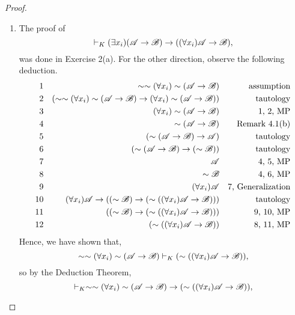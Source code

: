 \begin{proposition}
\begin{proof}
\begin{enumerate}
\begin{enumerate}
          \item 
            The proof of
            \[\vdash_{K} (\exists x_i)(\mathscr{A} \rightarrow \mathscr{B}) \rightarrow ((\forall x_i)\mathscr{A} \rightarrow \mathscr{B}),\]
            was done in Exercise 2(a). For the other direction, observe the following deduction.
            \begin{align*}
              \text{1}&&
              \sim\sim(\forall x_i)\sim(\mathscr{A} \rightarrow \mathscr{B})&&
              \text{assumption}\\
              \text{2}&&
              (\sim\sim(\forall x_i)\sim(\mathscr{A} \rightarrow \mathscr{B}) \rightarrow (\forall x_i)\sim(\mathscr{A} \rightarrow \mathscr{B}))&&
              \text{tautology}\\
              \text{3}&&
              (\forall x_i)\sim(\mathscr{A} \rightarrow \mathscr{B})&&
              \text{1, 2, MP}\\
              \text{4}&&
              \sim(\mathscr{A} \rightarrow \mathscr{B})&&
              \text{Remark 4.1(b)}\\
              \text{5}&&
              (\sim(\mathscr{A} \rightarrow \mathscr{B}) \rightarrow \mathscr{A})&&
              \text{tautology}\\
              \text{6}&&
              (\sim(\mathscr{A} \rightarrow \mathscr{B}) \rightarrow (\sim\mathscr{B}))&&
              \text{tautology}\\
              \text{7}&&
              \mathscr{A}&&
              \text{4, 5, MP}\\
              \text{8}&&
              \sim\mathscr{B}&&
              \text{4, 6, MP}\\
              \text{9}&&
              (\forall x_i)\mathscr{A}&&
              \text{7, Generalization}\\
              \text{10}&&
              (\forall x_i)\mathscr{A} \rightarrow ((\sim\mathscr{B}) \rightarrow (\sim((\forall x_i)\mathscr{A} \rightarrow \mathscr{B})))&&
              \text{tautology}\\
              \text{11}&&
              ((\sim\mathscr{B}) \rightarrow (\sim((\forall x_i)\mathscr{A} \rightarrow \mathscr{B})))&&
              \text{9, 10, MP}\\
              \text{12}&&
              (\sim((\forall x_i)\mathscr{A} \rightarrow \mathscr{B}))&&
              \text{8, 11, MP}
            \end{align*}
            Hence, we have shown that,
            \[\sim\sim(\forall x_i)\sim(\mathscr{A} \rightarrow \mathscr{B}) \vdash_{K} (\sim((\forall x_i)\mathscr{A} \rightarrow \mathscr{B})),\]
            so by the Deduction Theorem,
            \[\vdash_{K} \sim\sim(\forall x_i)\sim(\mathscr{A} \rightarrow \mathscr{B}) \rightarrow (\sim((\forall x_i)\mathscr{A} \rightarrow \mathscr{B})),\]

\end{enumerate}
\end{enumerate}
\end{proof}
\end{proposition}
